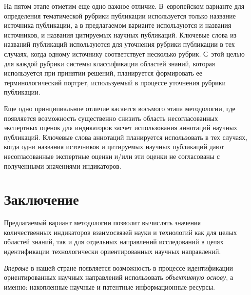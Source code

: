 \begin{multicols}{2}
  На пятом этапе отметим еще одно важное отличие. В~европейском варианте для 
определения тематической рубрики публикации используется только название источника 
публикации, а в пред\-ла\-га\-емом варианте используются и названия источников, и названия 
цитируемых научных публикаций. Ключевые слова из названий публикаций используются для 
уточнения рубрики публикации в тех случаях, когда одному источнику соответствует 
несколько рубрик. С~этой целью для каждой рубрики системы классификации областей знаний, 
которая используется при принятии решений, планируется формировать ее терминологический 
портрет, используемый в процессе уточнения рубрики публикации.
  
  Еще одно принципиальное отличие касается вось\-мо\-го этапа методологии, где появляется 
возможность существенно снизить область несогласованных экспертных оценок для 
индикаторов за\linebreak счет использования аннотаций научных публикаций. Ключевые слова 
аннотаций планируется использовать в тех случаях, когда одни названия источников и 
цитируемых научных публикаций \mbox{дают} не\-со\-гла\-со\-ван\-ные экспертные оценки и/или эти оценки 
не согласованы с полученными значениями индикаторов.

\section{Заключение}
  
  Предлагаемый вариант методологии позволит вычислять значения количественных 
индикаторов взаимосвязей науки и технологий как для целых областей знаний, так и для 
отдельных направлений исследований в целях идентификации технологически 
ориентированных научных направлений.
  
  \textit{Впервые} в нашей стране появляется возможность в процессе идентификации 
ориентированных научных направлений использовать \textit{объективную основу}, а именно: 
накопленные научные и патентные информационные ресурсы.
  

\end{multicols}

